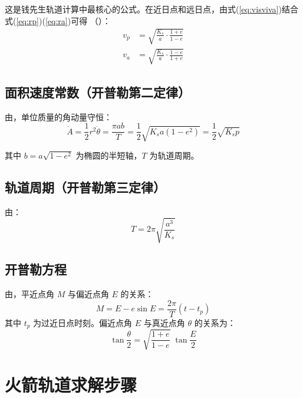 \documentclass[12pt,a4paper]{ctexart}
\begin{document}
这是钱先生轨道计算中最核心的公式。在近日点和远日点，由式(\ref{eq:visviva})结合式(\ref{eq:rp})(\ref{eq:ra})可得
（\cite[\S6.2, 式(6.6)--(6.7)]{qian2008}）：
\begin{align}
    v_p &= \sqrt{\frac{K_s}{a} \cdot \frac{1+e}{1-e}} \label{eq:vp} \\
    v_a &= \sqrt{\frac{K_s}{a} \cdot \frac{1-e}{1+e}} \label{eq:va}
\end{align}

\subsection{面积速度常数（开普勒第二定律）}

由\cite[\S6.2, 式(6.5)]{qian2008}，单位质量的角动量守恒：
\begin{equation}\label{eq:areal}
    \dot{A} = \frac{1}{2} r^2 \dot{\theta} = \frac{\pi a b}{T}
    = \frac{1}{2}\sqrt{K_s a(1-e^2)} = \frac{1}{2}\sqrt{K_s p}
\end{equation}

其中 $b = a\sqrt{1-e^2}$ 为椭圆的半短轴\cite[\S6.2, 式(6.3)]{qian2008}，$T$ 为轨道周期。

\subsection{轨道周期（开普勒第三定律）}

由\cite[\S5.4, 式(5.15); \S6.2, 式(6.4)]{qian2008}：
\begin{equation}\label{eq:period}
    T = 2\pi\sqrt{\frac{a^3}{K_s}}
\end{equation}

\subsection{开普勒方程}

由\cite[\S5.4, pp.~111]{qian2008}，平近点角 $M$ 与偏近点角 $E$ 的关系：
\begin{equation}\label{eq:kepler}
    M = E - e\sin E = \frac{2\pi}{T}(t - t_p)
\end{equation}
其中 $t_p$ 为过近日点时刻。偏近点角 $E$ 与真近点角 $\theta$ 的关系为：
\begin{equation}\label{eq:EtoTheta}
    \tan\frac{\theta}{2} = \sqrt{\frac{1+e}{1-e}}\;\tan\frac{E}{2}
\end{equation}

\section{火箭轨道求解步骤}
\end{document}
